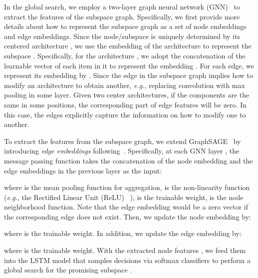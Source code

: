 \documentclass[lettersize,journal]{IEEEtran}
\def\eg{\emph{e.g.}} \def\Eg{\emph{E.g.}}
\begin{document}
{
In the global search, we employ a two-layer graph neural network (GNN)~\cite{you2020handling} to extract the features of the subspace graph.
Specifically, we first provide more details about how to represent the subspace graph as a set of node embeddings and edge embeddings.
Since the node/subspace  is uniquely determined by its centered architecture , we use the embedding of the architecture  to represent the subspace .
Specifically, for the architecture , we adopt the concatenation of the learnable vector of each item  in it to represent the embedding .
For each edge, we represent its embedding  by .
Since the edge in the subspace graph implies how to modify an architecture to obtain another, \eg, replacing convolution with max pooling in some layer.
Given two center architectures, if the components are the same in some positions, the corresponding part of edge features will be zero.
In this case, the edges explicitly capture the information on how to modify one to another.

To extract the features from the subspace graph, we extend GraphSAGE~\cite{hamilton2017graphsage} by introducing \emph{edge embeddings} following~\cite{you2020handling}.
Specifically, at each GNN layer , the message passing function takes the concatenation of the node embedding and the edge embeddings in the previous layer as the input:

where  is the mean pooling function for aggregation,  is the non-linearity function (\eg, the Rectified Linear Unit (ReLU)~\cite{nair2010rectified} ),  is the trainable weight,  is the node neighborhood function.
Note that the edge embedding would be a zero vector if the corresponding edge does not exist.
Then, we update the node embedding  by:

where  is the trainable weight.
In addition, we update the edge embedding  by:

where  is the trainable weight.
With the extracted node features , we feed them into the LSTM model that samples decisions via softmax classifiers to perform a global search for the promising subspace .
 }



	
\end{document}
